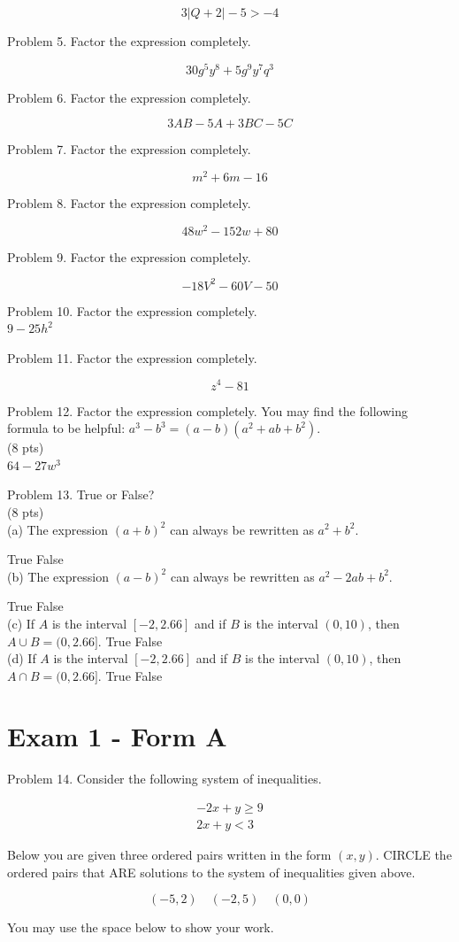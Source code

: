 \documentclass{ximera}
\begin{document}
$$3|Q+2|-5>-4$$

Problem 5. Factor the expression completely.

$$30 g^{5} y^{8}+5 g^{9} y^{7} q^{3}$$

Problem 6. Factor the expression completely.

$$3 A B-5 A+3 B C-5 C$$

Problem 7. Factor the expression completely.

$$m^{2}+6 m-16$$

Problem 8. Factor the expression completely.

$$48 w^{2}-152 w+80$$

Problem 9. Factor the expression completely.

$$-18 V^{2}-60 V-50$$

Problem 10. Factor the expression completely.\\
$9-25 h^{2}$

Problem 11. Factor the expression completely.

$$z^{4}-81$$

Problem 12. Factor the expression completely. You may find the following formula to be helpful: $a^{3}-b^{3}=(a-b)\left(a^{2}+a b+b^{2}\right)$.\\
(8 pts)\\
$64-27 w^{3}$

Problem 13. True or False?\\
(8 pts)\\
(a) The expression $(a+b)^{2}$ can always be rewritten as $a^{2}+b^{2}$.

True False\\
(b) The expression $(a-b)^{2}$ can always be rewritten as $a^{2}-2 a b+b^{2}$.

True False\\
(c) If $A$ is the interval $[-2,2.66]$ and if $B$ is the interval $(0,10)$, then $A \cup B=(0,2.66]$. True False\\
(d) If $A$ is the interval $[-2,2.66]$ and if $B$ is the interval $(0,10)$, then $A \cap B=(0,2.66]$. True False

\section*{Exam 1 - Form A}
Problem 14. Consider the following system of inequalities.

$$\begin{array}{r}
-2 x+y \geq 9 \\
2 x+y<3
\end{array}$$

Below you are given three ordered pairs written in the form $(x, y)$. CIRCLE the ordered pairs that ARE solutions to the system of inequalities given above.

$$(-5,2) \quad(-2,5) \quad(0,0)$$

You may use the space below to show your work.
\end{document}
